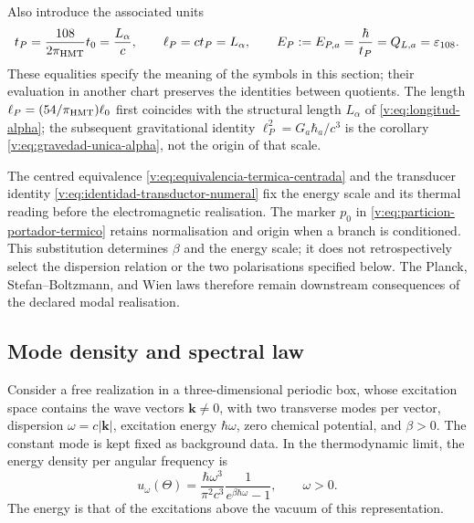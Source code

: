 Also introduce the associated units
\begin{equation}
 t_P=\frac{108}{2\pi_{\mathrm{HMT}}}t_0=\frac{L_\alpha}{c},\qquad
 \ell_P=ct_P=L_\alpha,\qquad
 E_P:=E_{P,a}=\frac{\hbar}{t_P}=Q_{L,a}=\varepsilon_{108}.
 \label{v:eq:unidades-termicas-calendario}
\end{equation}
These equalities specify the meaning of the symbols in this section;
their evaluation in another chart preserves the identities between quotients.
The length \(\ell_P=(54/\pi_{\mathrm{HMT}})\ell_0\) first coincides with the
structural length \(L_\alpha\) of \eqref{v:eq:longitud-alpha}; the
subsequent gravitational identity \(\ell_P^2=G_a\hbar_a/c^3\) is the
corollary \eqref{v:eq:gravedad-unica-alpha}, not the origin of that scale.

The centred equivalence
\eqref{v:eq:equivalencia-termica-centrada} and the transducer identity
\eqref{v:eq:identidad-transductor-numeral} fix the energy scale and its
thermal reading before the electromagnetic realisation. The marker
$p_0$ in \eqref{v:eq:particion-portador-termico} retains normalisation
and origin when a branch is conditioned. This substitution determines
$\beta$ and the energy scale; it does not retrospectively select the
dispersion relation or the two polarisations specified below. The
Planck, Stefan--Boltzmann, and Wien laws therefore remain downstream
consequences of the declared modal realisation.

\subsection{Mode density and spectral law}

\begin{proposition}
\label{v:prop:ley-espectral}
Consider a free realization in a three-dimensional periodic box,
whose excitation space contains the wave vectors
\(\mathbf k\ne0\), with two transverse modes per vector, dispersion
\(\omega=c|\mathbf k|\), excitation energy \(\hbar\omega\),
zero chemical potential, and \(\beta>0\). The constant mode is kept
fixed as background data. In the thermodynamic limit, the energy density
per angular frequency is
\begin{equation}
 u_\omega(\Theta)=\frac{\hbar\omega^3}{\pi^2c^3}
 \frac{1}{e^{\beta\hbar\omega}-1},\qquad \omega>0.
 \label{v:eq:planck-angular}
\end{equation}
The energy is that of the excitations above the vacuum of this
representation.
\end{proposition}

